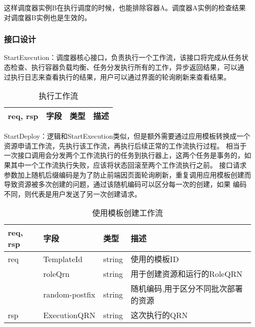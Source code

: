 这样调度器实例B在执行调度的时候，也能排除容器A。调度器A实例的检查结果对调度器B实例也是生效的。


\subsubsection{接口设计}

StartExecution：调度器核心接口，负责执行一个工作流，该接口将完成从任务状态检查、执行容器负载均衡、任务分发执行所有的工作，异步返回结果，可以通
过执行日志来查看执行的结果，用户可以通过界面的轮询刷新来查看结果。
\begin{table}[H]
    \centering
    \caption{执行工作流}
    \label{tab:design-interface-start-execution}
    \begin{tabular}{llll}
        \toprule
        req, rsp   & 字段 & 类型 & 描述 \\
        \midrule
        \bottomrule
    \end{tabular}
\end{table}

StartDeploy：逻辑和StartExecution类似，但是额外需要通过应用模板转换成一个资源申请工作流，先执行该工作流，再执行后续正常的工作流执行过程。
相当于一次接口调用会分发两个工作流执行的任务到执行器上，这两个任务是事务的，如果其中一个工作流执行失败，应该将状态回滚至两个工作流执行之前。
接口请求参数加上随机后缀编码是为了防止前端因页面轮询刷新，重复调用应用模板创建而导致资源被多次创建的问题，通过该随机编码可以区分每一次的创建，如果
编码不同，则代表是用户发送了另一次创建请求。
    \begin{table}[H]
        \centering
        \caption{使用模板创建工作流}
        \label{tab:design-interface-start-deploy}
        \begin{tabular}{llll}
            \toprule
            req, rsp   & 字段 & 类型 & 描述 \\
            \midrule
            req & TemplateId & string & 使用的模板ID\\
            & roleQrn & string & 用于创建资源和运行的RoleQRN\\
            & random-postfix & string & 随机编码,用于区分不同批次部署的资源\\ \hline
            rsp & ExecutionQRN & string & 这次执行的QRN\\
            \bottomrule
        \end{tabular}
    \end{table}

